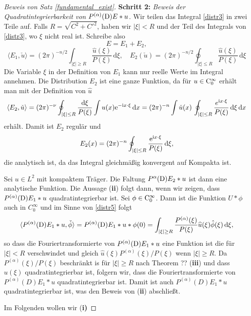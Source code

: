 \begin{proof}[Beweis von Satz \ref{fundamental_exist}]
\textbf{Schritt 2:} \emph{Beweis der Quadratintegrierbarkeit von $P^{(\alpha)}(\mathrm D) E * u$.}
Wir teilen das Integral \eqref{distr3} in zwei Teile auf. Falls $R=\sqrt{C^2 + C'^2}$, haben wir $|\xi|<R$ und der Teil des Integrals von \eqref{distr3}, wo $\xi$ nicht real ist. Schreibe also 
\begin{equation}\label{distr4}
E=E_1 + E_2,
\end{equation}
\begin{equation}\label{distr5}
\langle E_1,\check u\rangle = (2\pi)^{-n/2} \int_{|\xi|\ge R} \frac{\widehat u(\xi)}{P(\xi)}\, \mathrm d\xi, \quad E_2(\check u)= (2\pi)^{-n/2} \oint_{|\xi|\le R} \frac{\widehat u(\xi)}{P(\xi)}\, \mathrm d\xi
\end{equation}
Die Variable $\xi$ in der Definition von $E_1$ kann nur reelle Werte im Integral annehmen. Die Distribution $E_2$ ist eine ganze Funktion, da für $u\in\mathrm C_0^\infty$ erhält man mit der Definition von $\widehat u$
\begin{equation}
\langle E_2, \check u\rangle = (2\pi)^{-\nu} \oint_{|\xi |\le R} \frac{\mathrm d\xi}{P(\xi)} \int u(x) \mathrm e^{-\mathrm i x\cdot\xi}\, \mathrm dx= (2\pi)^{-n} \int \check u(x) \, \oint_{|\xi|\le R} \frac{e^{\mathrm i x\cdot \xi}}{P(\xi)}\, \mathrm d\xi \, \mathrm dx
\end{equation}
erhält. Damit ist $E_2$ regulär und
\begin{equation}
E_2(x) = (2\pi)^{-n} \oint_{|\xi|\le R} \frac{\mathrm e^{\mathrm i x\cdot \xi}}{P(\xi)}\, \mathrm d\xi,
\end{equation}
die analytisch ist, da das Integral gleichmäßig konvergent auf Kompakta ist. 

Sei $u\in L^2$ mit kompaktem Träger. Die Faltung $P^{\alpha}(\mathrm D)E_2 *u$ ist dann eine analytische Funktion.  Die Aussage ({\bf ii}) folgt dann, wenn wir zeigen, dass $P^{(\alpha)}(\mathrm D) E_1 * u$ quadratintegrierbar ist.  Sei $\phi \in\mathrm C_0^\infty$. Dann ist die Funktion $U*\phi$ auch in $C_0^\infty$ und im Sinne von \eqref{distr5} folgt
\begin{equation}
\langle P^{(\alpha)} (\mathrm D) E_1 * u, \check \phi\rangle  = P^{(\alpha)}(\mathrm D) E_1 * u * \phi(0) = \int_{|\xi| \ge R} \frac{P^{(\alpha)}(\xi)}{P(\xi)} \widehat u(\xi) \hat \phi(\xi) \, \mathrm d\xi,
\end{equation}     
so dass die Fouriertransformierte von $P^{(\alpha)}(\mathrm D) E_1 * u$ eine Funktion ist die für $|\xi|<R$ verschwindet und gleich $\hat u(\xi) P^{(\alpha)}(\xi)/P(\xi)$ wenn $|\xi|\ge R$. Da $P^{(\alpha)}(\xi)/P(\xi)$ beschränkt is für $|\xi|\ge R$ nach Theorem ?? ({\bf iii})  und dass $\hat u(\xi)$ quadratintegrierbar ist, folgern wir, dass die Fouriertransformierte von $P^{(\alpha)}(D) E_1 * u$ quadratintegrierbar ist. Damit ist auch $P^{(\alpha)}(D) E_1 * u$ quadratintegrierbar ist, was den Beweis von ({\bf ii}) abschließt.  

Im Folgenden wollen wir (\bf{i}) 
\end{proof}
